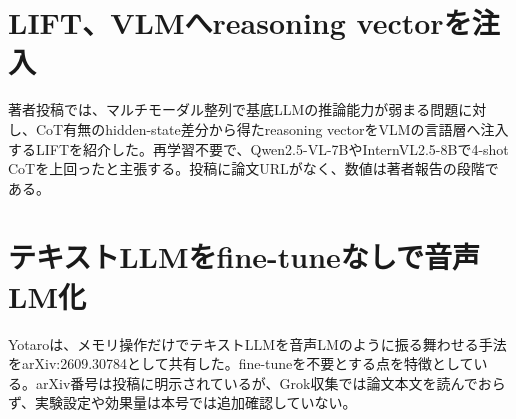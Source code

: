\section{LIFT、VLMへreasoning vectorを注入}
著者投稿では、マルチモーダル整列で基底LLMの推論能力が弱まる問題に対し、CoT有無のhidden-state差分から得たreasoning vectorをVLMの言語層へ注入するLIFTを紹介した。再学習不要で、Qwen2.5-VL-7BやInternVL2.5-8Bで4-shot CoTを上回ったと主張する。投稿に論文URLがなく、数値は著者報告の段階である。

\section{テキストLLMをfine-tuneなしで音声LM化}
Yotaroは、メモリ操作だけでテキストLLMを音声LMのように振る舞わせる手法をarXiv:2609.30784として共有した。fine-tuneを不要とする点を特徴としている。arXiv番号は投稿に明示されているが、Grok収集では論文本文を読んでおらず、実験設定や効果量は本号では追加確認していない。
